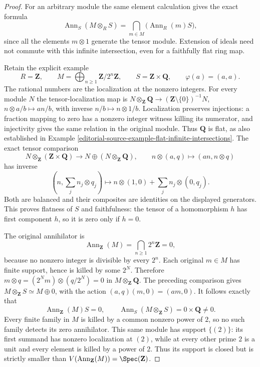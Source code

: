 \begin{proof}
\medskip\noindent
For an arbitrary module the same element calculation gives
the exact formula
$$
\operatorname{Ann}_S(M\otimes_RS)
=\bigcap_{m\in M}\bigl(\operatorname{Ann}_R(m)S\bigr),
$$
since all the elements $m\otimes1$ generate the tensor module.
Extension of ideals need not commute with this infinite
intersection, even for a faithfully flat ring map.

Retain the explicit example
$$
R=\mathbf Z,\qquad
M=\bigoplus_{n\geq1}\mathbf Z/2^n\mathbf Z,\qquad
S=\mathbf Z\times\mathbf Q,
\qquad \varphi(a)=(a,a).
$$
The rational numbers are the localization at the nonzero
integers. For every module $N$ the tensor-localization map is
$N\otimes_{\mathbf Z}\mathbf Q\to
(\mathbf Z\setminus\{0\})^{-1}N$,
$n\otimes a/b\mapsto an/b$, with inverse $n/b\mapsto n\otimes1/b$.
Localization preserves injections: a fraction mapping to zero
has a nonzero integer witness killing its numerator, and
injectivity gives the same relation in the original module.
Thus $\mathbf Q$ is flat, as also established in
Example \ref{editorial-source-example-flat-infinite-intersections}.
The exact tensor comparison
$$
N\otimes_{\mathbf Z}(\mathbf Z\times\mathbf Q)
\longrightarrow N\oplus(N\otimes_{\mathbf Z}\mathbf Q),
\qquad n\otimes(a,q)\longmapsto(an,n\otimes q)
$$
has inverse
$$
\left(n,\sum_j n_j\otimes q_j\right)
\longmapsto n\otimes(1,0)+\sum_j n_j\otimes(0,q_j).
$$
Both are balanced and their composites are identities on
the displayed generators. This proves flatness of $S$ and
faithfulness: the tensor of a homomorphism $h$ has first
component $h$, so it is zero only if $h=0$.

The original annihilator is
$$
\operatorname{Ann}_{\mathbf Z}(M)
=\bigcap_{n\geq1}2^n\mathbf Z=0,
$$
because no nonzero integer is divisible by every $2^n$.
Each original $m\in M$ has finite support, hence is killed
by some $2^N$. Therefore
$m\otimes q=(2^Nm)\otimes(q/2^N)=0$ in
$M\otimes_{\mathbf Z}\mathbf Q$. The preceding comparison gives
$M\otimes_{\mathbf Z}S\simeq M\oplus0$, with the action
$(a,q)(m,0)=(am,0)$. It follows exactly that
$$
\operatorname{Ann}_{\mathbf Z}(M)S=0,
\qquad
\operatorname{Ann}_S(M\otimes_{\mathbf Z}S)=0\times\mathbf Q\ne0.
$$
Every finite family in $M$ is killed by a common nonzero
power of $2$, so no such family detects its zero annihilator.
This same module has support $\{(2)\}$: its first summand
has nonzero localization at $(2)$, while at every other
prime $2$ is a unit and every element is killed by a power
of $2$. Thus its support is closed but is strictly smaller
than $V(\operatorname{Ann}_{\mathbf Z}(M))=\Spec(\mathbf Z)$.


\end{proof}
